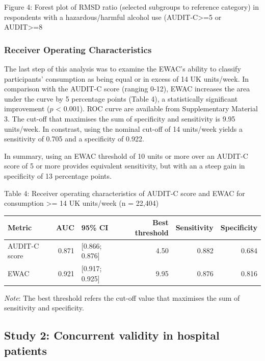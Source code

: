 \documentclass[]{article}
\begin{document}
Figure 4: Forest plot of RMSD ratio (selected subgroups to reference
category) in respondents with a hazardous/harmful alcohol use
(AUDIT-C\textgreater{}=5 or AUDIT\textgreater{}=8

\hypertarget{receiver-operating-characteristics}{%
\subsubsection{Receiver Operating
Characteristics}\label{receiver-operating-characteristics}}

The last step of this analysis was to examine the EWAC's ability to
classify participants' consumption as being equal or in excess of 14 UK
units/week. In comparison with the AUDIT-C score (ranging 0-12), EWAC
increases the area under the curve by 5 percentage points (Table 4), a
statistically significant improvement (\(p\) \textless{} 0.001). ROC
curve are available from Supplementary Material 3. The cut-off that
maximises the sum of specificity and sensitivity is 9.95 units/week. In
constrast, using the nominal cut-off of 14 units/week yields a
sensitivity of 0.705 and a specificity of 0.922.

In summary, using an EWAC threshold of 10 units or more over an AUDIT-C
score of 5 or more provides equivalent sensitivity, but with an a steep
gain in specificity of 13 percentage points.

Table 4: Receiver operating characteristics of AUDIT-C score and EWAC
for consumption \textgreater{}= 14 UK units/week (n = 22,404)

\begin{tabular}{l|r|l|r|r|r}
\hline
Metric & AUC & 95\% CI & Best threshold & Sensitivity & Specificity\\
\hline
AUDIT-C score & 0.871 & [0.866; 0.876] & 4.50 & 0.882 & 0.684\\
\hline
EWAC & 0.921 & [0.917; 0.925] & 9.95 & 0.876 & 0.816\\
\hline
\end{tabular}

\emph{Note}: The best threshold refers the cut-off value that maximises
the sum of sensitivity and specificity.

\hypertarget{study-2-concurrent-validity-in-hospital-patients}{%
\subsection{Study 2: Concurrent validity in hospital
patients}\label{study-2-concurrent-validity-in-hospital-patients}}
\end{document}
